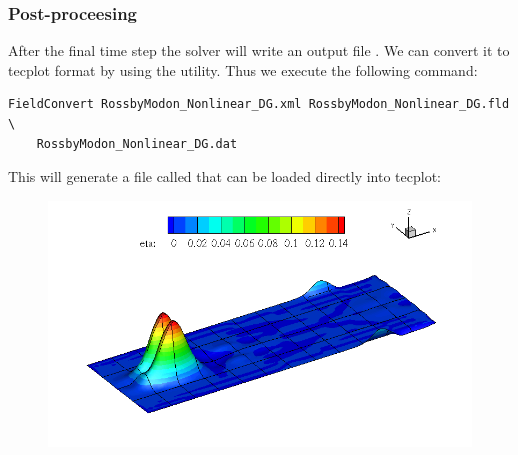 \subsubsection{Post-proceesing}
After the final time step the solver will write an output file 
. We can convert it to tecplot
format by using the  utility. Thus we execute the
following command:
\begin{lstlisting}[style=BashInputStyle]
FieldConvert RossbyModon_Nonlinear_DG.xml RossbyModon_Nonlinear_DG.fld \
    RossbyModon_Nonlinear_DG.dat
\end{lstlisting}
This will generate a file called  that
can be loaded directly into tecplot:

\begin{figure}
\includegraphics[width=\linewidth]{img/RossbyModon.png}
\end{figure}
